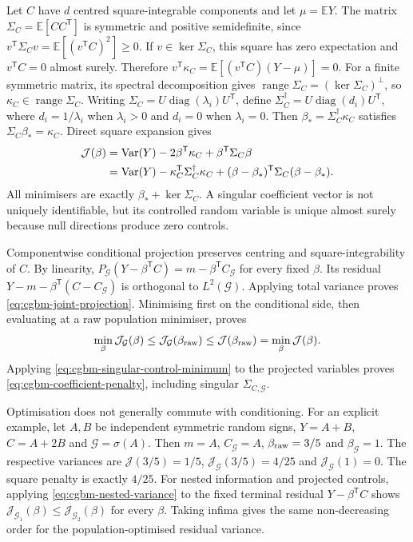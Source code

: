 \documentclass[11pt]{article}
\begin{document}
Let $C$ have $d$ centred square-integrable components and let
$\mu=\mathbb E Y$. The matrix $\Sigma_C=\mathbb E[CC^{\mathsf T}]$ is
symmetric and positive semidefinite, since
$v^{\mathsf T}\Sigma_C v=\mathbb E[(v^{\mathsf T}C)^2]\geq0$.
If $v\in\ker \Sigma_C$, this square has zero expectation and
$v^{\mathsf T}C=0$ almost surely. Therefore
$v^{\mathsf T}\kappa_C=\mathbb E[(v^{\mathsf T}C)(Y-\mu)]=0$.
For a finite symmetric matrix, its spectral decomposition gives
$\operatorname{range}\Sigma_C=(\ker \Sigma_C)^\perp$, so $\kappa_C\in\operatorname{range}\Sigma_C$.
Writing $\Sigma_C=U\operatorname{diag}(\lambda_i)U^{\mathsf T}$, define
$\Sigma_C^\dagger=U\operatorname{diag}(d_i)U^{\mathsf T}$, where
$d_i=1/\lambda_i$ when $\lambda_i>0$ and $d_i=0$ when $\lambda_i=0$.
Then $\beta_*=\Sigma_C^\dagger \kappa_C$ satisfies $\Sigma_C\beta_*=\kappa_C$.
Direct square expansion gives
\begin{align}
 \mathcal J(\beta)&=\operatorname{Var}(Y)-2\beta^{\mathsf T}\kappa_C+
 \beta^{\mathsf T}\Sigma_C\beta\notag\\
 &=\operatorname{Var}(Y)-\kappa_C^{\mathsf T}\Sigma_C^\dagger \kappa_C+
 (\beta-\beta_*)^{\mathsf T}\Sigma_C(\beta-\beta_*).
 \label{eq:cgbm-singular-control-minimum}
\end{align}
All minimisers are exactly $\beta_*+\ker \Sigma_C$. A singular coefficient
vector is not uniquely identifiable, but its controlled random variable
is unique almost surely because null directions produce zero controls.

Componentwise conditional projection preserves centring and
square-integrability of $C$. By linearity,
$P_{\mathcal G}(Y-\beta^{\mathsf T}C)=m-\beta^{\mathsf T}C_{\mathcal G}$
for every fixed $\beta$. Its residual
$Y-m-\beta^{\mathsf T}(C-C_{\mathcal G})$ is orthogonal to
$L^2(\mathcal G)$. Applying total variance proves
\eqref{eq:cgbm-joint-projection}. Minimising first on the conditional
side, then evaluating at a raw population minimiser, proves
\begin{equation}
 \min_\beta \mathcal J_{\mathcal G}(\beta)
 \leq \mathcal J_{\mathcal G}(\beta_{\rm raw})
 \leq \mathcal J(\beta_{\rm raw})=\min_\beta \mathcal J(\beta).
 \label{eq:cgbm-oracle-control-order}
\end{equation}
Applying \eqref{eq:cgbm-singular-control-minimum} to the projected
variables proves \eqref{eq:cgbm-coefficient-penalty}, including singular
$\Sigma_{C,\mathcal G}$.

Optimisation does not generally commute with conditioning. For an
explicit example, let $A,B$ be independent symmetric random signs,
$Y=A+B$, $C=A+2B$ and $\mathcal G=\sigma(A)$. Then
$m=A$, $C_{\mathcal G}=A$, $\beta_{\rm raw}=3/5$ and
$\beta_{\mathcal G}=1$. The respective variances are
$\mathcal J(3/5)=1/5$, $\mathcal J_{\mathcal G}(3/5)=4/25$ and
$\mathcal J_{\mathcal G}(1)=0$. The square penalty is exactly $4/25$.
For nested information and projected controls, applying
\eqref{eq:cgbm-nested-variance} to the fixed terminal residual
$Y-\beta^{\mathsf T}C$ shows
$\mathcal J_{\mathcal G_1}(\beta)\leq \mathcal J_{\mathcal G_2}(\beta)$ for every
$\beta$. Taking infima gives the same non-decreasing order for the
population-optimised residual variance.
\end{document}
